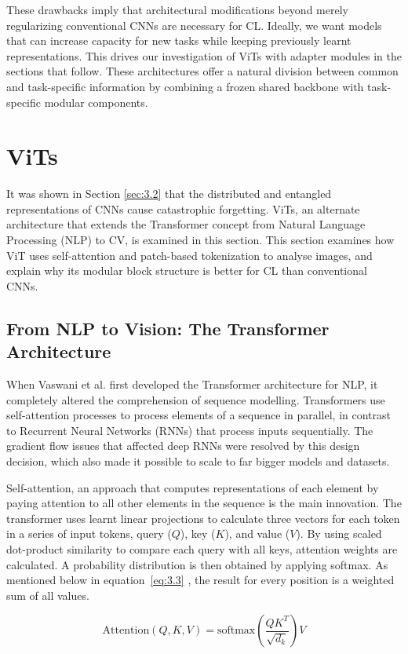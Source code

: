 \documentclass[english, LaM, oneside]{sapthesis}%
\numberwithin{equation}{chapter}
\begin{document}
These drawbacks imply that architectural modifications beyond merely regularizing conventional CNNs are necessary for CL. Ideally, we want models that can increase capacity for new tasks while keeping previously learnt representations. This drives our investigation of ViTs with adapter modules in the sections that follow. These architectures offer a natural division between common and task-specific information by combining a frozen shared backbone with task-specific modular components.

\section{ViTs}
\label{sec:3.3}
It was shown in Section \ref{sec:3.2} that the distributed and entangled representations of CNNs cause catastrophic forgetting. ViTs, an alternate architecture that extends the Transformer concept from Natural Language Processing (NLP) to CV, is examined in this section. This section examines how ViT uses self-attention and patch-based tokenization to analyse images, and explain why its modular block structure is better for CL than conventional CNNs.
\subsection{From NLP to Vision: The Transformer Architecture}
When Vaswani et al.\cite{26} first developed the Transformer architecture for NLP, it completely altered the comprehension of sequence modelling. Transformers use self-attention processes to process elements of a sequence in parallel, in contrast to Recurrent Neural Networks (RNNs) that process inputs sequentially. The gradient flow issues that affected deep RNNs were resolved by this design decision, which also made it possible to scale to far bigger models and datasets.

Self-attention, an approach that computes representations of each element by paying attention to all other elements in the sequence is the main innovation\cite{26}. The transformer uses learnt linear projections to calculate three vectors for each token in a series of input tokens, query ($Q$), key ($K$), and value ($V$). By using scaled dot-product similarity to compare each query with all keys, attention weights are calculated. A probability distribution is then obtained by applying softmax. As mentioned below in equation~\ref{eq:3.3} , the result for every position is a weighted sum of all values.

\begin{equation}
    \mathrm{Attention}(Q, K, V) = \mathrm{softmax} \left( \frac{Q K^{T}}{\sqrt{d_k}} \right) V
    \label{eq:3.3}
\end{equation}
\end{document}
